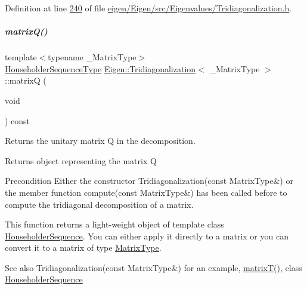 Definition at line \hyperlink{eigen_2_eigen_2src_2_eigenvalues_2_tridiagonalization_8h_source_l00240}{240} of file \hyperlink{eigen_2_eigen_2src_2_eigenvalues_2_tridiagonalization_8h_source}{eigen/\+Eigen/src/\+Eigenvalues/\+Tridiagonalization.\+h}.

\mbox{\label{group___eigenvalues___module_a000f7392eda930576ffd2af1fae54af2}} 
\subparagraph{\texorpdfstring{matrix\+Q()}{matrixQ()}\hspace{0.1cm}{\footnotesize\ttfamily [2/2]}}
{\footnotesize\ttfamily template$<$typename \+\_\+\+Matrix\+Type$>$ \\
\hyperlink{group___eigenvalues___module_af322315c8bea9990152c9d09bfa2a69f}{Householder\+Sequence\+Type} \hyperlink{group___eigenvalues___module_class_eigen_1_1_tridiagonalization}{Eigen\+::\+Tridiagonalization}$<$ \+\_\+\+Matrix\+Type $>$\+::matrixQ (\begin{DoxyParamCaption}\item[{void}]{ }\end{DoxyParamCaption}) const\hspace{0.3cm}{\ttfamily [inline]}}



Returns the unitary matrix Q in the decomposition. 

\begin{DoxyReturn}{Returns}
object representing the matrix Q
\end{DoxyReturn}
\begin{DoxyPrecond}{Precondition}
Either the constructor Tridiagonalization(const Matrix\+Type\&) or the member function compute(const Matrix\+Type\&) has been called before to compute the tridiagonal decomposition of a matrix.
\end{DoxyPrecond}
This function returns a light-\/weight object of template class \hyperlink{group___householder___module_class_eigen_1_1_householder_sequence}{Householder\+Sequence}. You can either apply it directly to a matrix or you can convert it to a matrix of type \hyperlink{group___eigenvalues___module_add0f4b2216d0ea8ee0f7d8525deaf0a9}{Matrix\+Type}.

\begin{DoxySeeAlso}{See also}
Tridiagonalization(const Matrix\+Type\&) for an example, \hyperlink{group___eigenvalues___module_a6eb5ef94b8b9bb013c0e69b6df56d0df}{matrix\+T()}, class \hyperlink{group___householder___module_class_eigen_1_1_householder_sequence}{Householder\+Sequence} 
\end{DoxySeeAlso}


